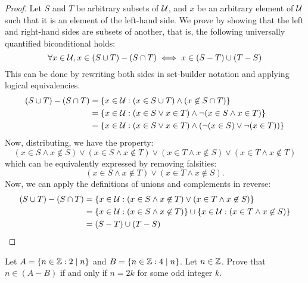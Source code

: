 \documentclass{agony}
\begin{document}
\begin{proof}
  Let $S$ and $T$ be arbitrary subsets of $\mathcal{U}$, and $x$ be an arbitrary element of $\mathcal{U}$ such that it is an element of the left-hand side.
  We prove by showing that the left and right-hand sides are subsets of another,
  that is, the following universally quantified biconditional holds:
  \begin{equation*}
    \forall x \in \mathcal{U}, x \in (S \cup T)-(S \cap T) \iff x \in (S-T) \cup (T-S)
  \end{equation*}
  This can be done by rewriting both sides in set-builder notation and applying logical equivalencies.
  \begin{align*}
    (S \cup T)-(S \cap T)
     & = \{x\in\mathcal{U} : (x \in S \cup T) \land (x \not\in S \cap T)\}                       \\
     & = \{x\in\mathcal{U} : (x \in S \lor x \in T) \land \lnot (x \in S \land x \in T)\}        \\
     & = \{x\in\mathcal{U} : (x \in S \lor x \in T) \land (\lnot(x \in S) \lor \lnot(x \in T))\}
  \end{align*}
  Now, distributing, we have the property:
  \begin{equation*}
    (x \in S \land x \not\in S) \lor
    (x \in S \land x \not\in T) \lor
    (x \in T \land x \not\in S) \lor
    (x \in T \land x \not\in T)
  \end{equation*}
  which can be equivalently expressed by removing falsities:
  \begin{equation*}
    (x \in S \land x \not\in T) \lor (x \in T \land x \not\in S).
  \end{equation*}
  Now, we can apply the definitions of unions and complements in reverse:
  \begin{align*}
    (S \cup T)-(S \cap T)
     & = \{x\in\mathcal{U}:(x \in S \land x \not\in T) \lor (x \in T \land x \not\in S)\}             \\
     & = \{x\in\mathcal{U}:(x \in S \land x \not\in T)\} \cup \{x\in\mathcal{U}: (x \in T \land x \not\in S)\} \\
     & = (S-T) \cup (T-S) \qedhere
  \end{align*}
\end{proof}


\question Let $A=\{n\in\mathbb{Z} : 2\mid n\}$ and $B=\{n\in\mathbb{Z} : 4\mid n\}$.
Let $n \in \mathbb{Z}$. Prove that $n \in (A-B)$ if and only if $n=2k$ for some odd integer $k$.
\end{document}
